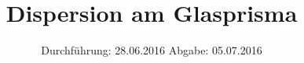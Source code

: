 
\subject{402}
\title{Dispersion am Glasprisma}
\date{
  Durchführung: 28.06.2016
  \hspace{3em}
  Abgabe: 05.07.2016
}



\maketitle
\newpage
\mbox{}
\newpage
\thispagestyle{empty}
\tableofcontents
\newpage






\nocite{numpy}
\nocite{matplotlib}
\nocite{uncertainties}
\printbibliography


